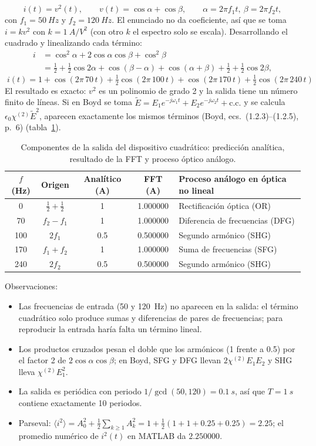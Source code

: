 \documentclass{article}
\begin{document}
\[
i(t)=v^2(t),\qquad v(t)=\cos\alpha+\cos\beta,\qquad \alpha=2\pi f_1t,\ \beta=2\pi f_2t,
\]
con $f_1=\SI{50}{Hz}$ y $f_2=\SI{120}{Hz}$. El enunciado no da coeficiente, así que se toma
$i=kv^2$ con $k=\SI{1}{A/V^2}$ (con otro $k$ el espectro solo se escala). Desarrollando el cuadrado y
linealizando cada término:
\begin{align*}
i&=\cos^2\alpha+2\cos\alpha\cos\beta+\cos^2\beta\\
&=\tfrac12+\tfrac12\cos2\alpha+\cos(\beta-\alpha)+\cos(\alpha+\beta)+\tfrac12+\tfrac12\cos2\beta ,
\end{align*}
\[
\boxed{\;i(t)=1+\cos(2\pi\,70\,t)+\tfrac12\cos(2\pi\,100\,t)+\cos(2\pi\,170\,t)+\tfrac12\cos(2\pi\,240\,t)\;}
\]
El resultado es exacto: $v^2$ es un polinomio de grado 2 y la salida tiene un número finito de líneas.
Si en Boyd se toma $\tilde E=E_1e^{-j\omega_1t}+E_2e^{-j\omega_2t}+\text{c.c.}$ y se calcula
$\epsilon_0\chi^{(2)}\tilde E^2$, aparecen exactamente los mismos términos
(Boyd, ecs.~(1.2.3)--(1.2.5), p.~6) (tabla~\ref{tab:2a}).

\begin{table}[H]
\centering
\caption{Componentes de la salida del dispositivo cuadrático: predicción analítica, resultado de la
FFT y proceso óptico análogo.}
\label{tab:2a}
\small
\begin{tabular}{@{}ccccl@{}}
\toprule
$f$ (Hz) & Origen & Analítico (A) & FFT (A) & Proceso análogo en óptica no lineal \\
\midrule
0   & $\tfrac12+\tfrac12$ & 1   & 1.000000 & Rectificación óptica (OR) \\
70  & $f_2-f_1$           & 1   & 1.000000 & Diferencia de frecuencias (DFG) \\
100 & $2f_1$              & 0.5 & 0.500000 & Segundo armónico (SHG) \\
170 & $f_1+f_2$           & 1   & 1.000000 & Suma de frecuencias (SFG) \\
240 & $2f_2$              & 0.5 & 0.500000 & Segundo armónico (SHG) \\
\bottomrule
\end{tabular}
\end{table}

Observaciones:
\begin{itemize}
  \item Las frecuencias de entrada (50 y \SI{120}{Hz}) no aparecen en la salida: el término
  cuadrático solo produce sumas y diferencias de pares de frecuencias; para reproducir la entrada
  haría falta un término lineal.
  \item Los productos cruzados pesan el doble que los armónicos (1 frente a 0.5) por el factor 2 de
  $2\cos\alpha\cos\beta$; en Boyd, SFG y DFG llevan $2\chi^{(2)}E_1E_2$ y SHG lleva $\chi^{(2)}E_1^2$.
  \item La salida es periódica con periodo $1/\gcd(50,120)=\SI{0.1}{s}$, así que $T=\SI{1}{s}$
  contiene exactamente 10 periodos.
  \item Parseval: $\langle i^2\rangle=A_0^2+\tfrac12\sum_{k\ge1}A_k^2=1+\tfrac12(1+1+0.25+0.25)=2.25$;
  el promedio numérico de $i^2(t)$ en MATLAB da $2.250000$.
\end{itemize}
\end{document}

